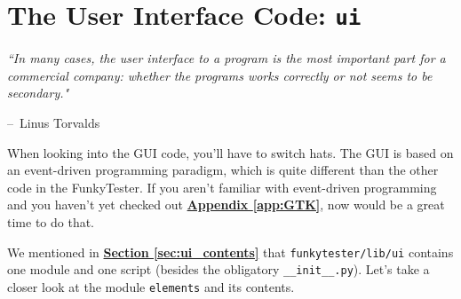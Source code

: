 \documentclass{report}
\makeatletter
\newenvironment{chapquote}[2][2em]
  {\setlength{\@tempdima}{#1}%
   \def\chapquote@author{#2}%
   \parshape 1 \@tempdima \dimexpr\textwidth-2\@tempdima\relax%
   \itshape}
  {\par\normalfont\hfill--\ \chapquote@author\hspace*{\@tempdima}\par\bigskip}
\makeatother
\begin{document}
	\begin{minipage}{\linewidth}
		\label{fig:ft_comm}
	\end{minipage} 
	\vspace{5pt}		%

\chapter{The User Interface Code: \texttt{ui}} \label{sec:ui}
\begin{chapquote}{Linus Torvalds \textit{}}
``In many cases, the user interface to a program is the most important part for a commercial company: whether the programs works correctly or not seems to be secondary."
\end{chapquote}
When looking into the GUI code, you'll have to switch hats. The GUI is based on an event-driven programming paradigm, which is quite different than the other code in the FunkyTester. If you aren't familiar with event-driven programming and you haven't yet checked out \hyperref[app:GTK]{\textbf{Appendix \ref{app:GTK}}}, now would be a great time to do that.

We mentioned in \hyperref[sec:ui_contents]{\textbf{Section \ref{sec:ui_contents}}} that \texttt{funkytester/lib/ui} contains one module and one script (besides the obligatory \texttt{\_\_init\_\_.py}). Let's take a closer look at the module \texttt{elements} and its contents.
\end{document}
